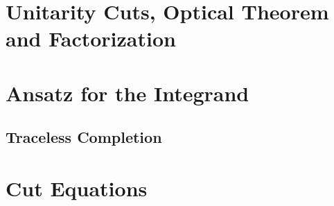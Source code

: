 \section{Unitarity Cuts, Optical Theorem and Factorization}

\section{Ansatz for the Integrand}
\label{sec:ansatz_integrand}

\subsection{Traceless Completion}
\label{sec:traceless_completion}

\section{Cut Equations}

